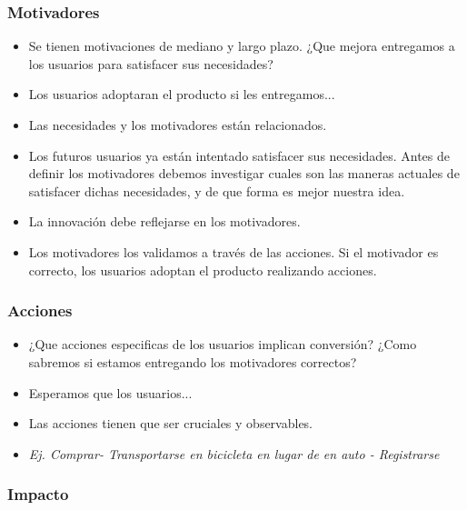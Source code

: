 \documentclass[titlepage,a4paper]{article}
\begin{document}
\subsubsection*{Motivadores}

\begin{itemize}
    \item Se tienen motivaciones de mediano y largo plazo. ¿Que mejora entregamos a los usuarios para satisfacer sus necesidades? 
    \item Los usuarios adoptaran el producto si les entregamos...
    \item Las necesidades y los motivadores están relacionados.
    \item Los futuros usuarios ya están intentado satisfacer sus necesidades. Antes de definir los motivadores debemos investigar cuales son las maneras actuales de satisfacer dichas necesidades, y de que forma es mejor nuestra idea.
    \item La innovación debe reflejarse en los motivadores. 
    \item Los motivadores los validamos a través de las acciones. Si el motivador es correcto, los usuarios adoptan el producto realizando acciones.
\end{itemize}

\subsubsection*{Acciones}

\begin{itemize}
    \item ¿Que acciones especificas de los usuarios implican conversión? ¿Como sabremos si estamos entregando los motivadores correctos?
    \item Esperamos que los usuarios...
    \item Las acciones tienen que ser cruciales y observables.
    \item \textit{Ej. Comprar- Transportarse en bicicleta en lugar de en auto - Registrarse}
\end{itemize}

\subsubsection*{Impacto}
\end{document}
